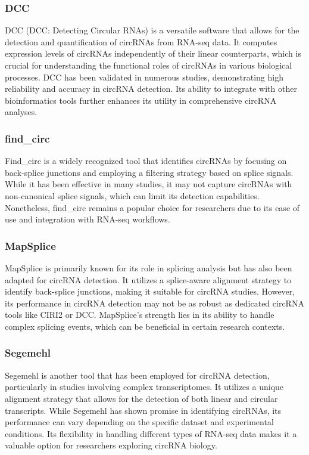 \subsubsection{DCC}
DCC (DCC: Detecting Circular RNAs) is a versatile software that allows for the
detection and quantification of circRNAs from RNA-seq data.
It computes expression levels of circRNAs independently of their linear
counterparts, which is crucial for understanding the functional roles of
circRNAs in various biological
processes\supercite{jakobi_profiling_2016,man_profiling_2020}.
DCC has been validated in numerous studies, demonstrating high reliability and
accuracy in circRNA detection\supercite{paraboschi_interpreting_2018}.
Its ability to integrate with other bioinformatics tools further enhances its
utility in comprehensive circRNA analyses.

\subsubsection{find\_circ}
Find\_circ is a widely recognized tool that identifies circRNAs by focusing on
back-splice junctions and employing a filtering strategy based on splice
signals.
While it has been effective in many studies, it may not capture circRNAs with
non-canonical splice signals, which can limit its detection
capabilities\supercite{sekar_circular_2018,liu_prkra_2022}.
Nonetheless, find\_circ remains a popular choice for researchers due to its
ease of use and integration with RNA-seq workflows.

\subsubsection{MapSplice}
MapSplice is primarily known for its role in splicing analysis but has also
been adapted for circRNA detection.
It utilizes a splice-aware alignment strategy to identify back-splice
junctions, making it suitable for circRNA studies.
However, its performance in circRNA detection may not be as robust as dedicated
circRNA tools like CIRI2 or
DCC\supercite{zeng_comprehensive_2017,chuang_nclscan_2016}.
MapSplice's strength lies in its ability to handle complex splicing events,
which can be beneficial in certain research contexts.

\subsubsection{Segemehl}
Segemehl is another tool that has been employed for circRNA detection,
particularly in studies involving complex transcriptomes.
It utilizes a unique alignment strategy that allows for the detection of both
linear and circular transcripts.
While Segemehl has shown promise in identifying circRNAs, its performance can
vary depending on the specific dataset and experimental
conditions\supercite{gao_ciri_2015,zeng_comprehensive_2017}.
Its flexibility in handling different types of RNA-seq data makes it a valuable
option for researchers exploring circRNA biology.

